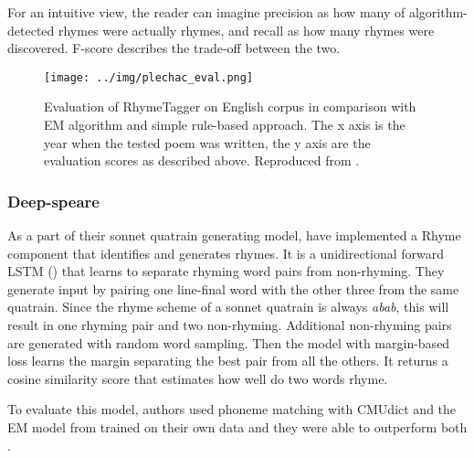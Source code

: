 For an intuitive view, the reader can imagine precision as how many of algorithm-detected rhymes were actually rhymes, and recall as how many rhymes were discovered. F-score describes the trade-off between the two.

\begin{figure}[h]\centering
	\texttt{[image: ../img/plechac\_eval.png]}
	\caption[RhymeTagger evaluation]{Evaluation of RhymeTagger on English corpus in comparison with EM algorithm and simple rule-based approach. The x axis is the year when the tested poem was written, the y axis are the evaluation scores as described above. Reproduced from \cite{plechac2017presentation}.}
	\label{screenshotRT}
\end{figure}


\subsubsection*{Deep-speare}
As a part of their \gls{sonnet} \gls{quatrain} generating model, \cite{lau2018deep} have implemented a Rhyme component that identifies and generates rhymes. It is a unidirectional forward \gls{LSTM} (\cite{hochreiter1997long}) that learns to separate rhyming word pairs from non-rhyming. They generate input by pairing one line-final word with the other three from the same quatrain. Since the rhyme scheme of a \gls{sonnet} \gls{quatrain} is always \textit{abab}, this will result in one rhyming pair and two non-rhyming. Additional non-rhyming pairs are generated with random word sampling. Then the model with margin-based loss learns the margin separating the best pair from all the others. It returns a cosine similarity score that estimates how well do two words rhyme.

To evaluate this model, authors used phoneme matching with CMUdict 
and the EM model from \cite{reddy2011unsupervised} trained on their own data and they were able to outperform both .




